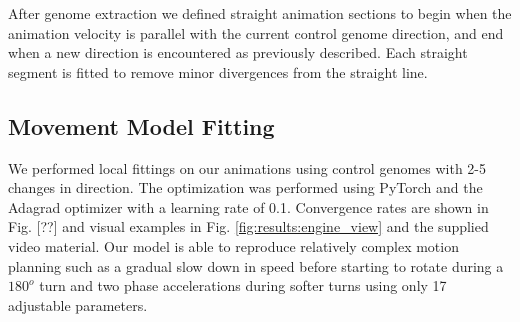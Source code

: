After genome extraction we defined straight animation sections to begin when the animation velocity is parallel with the current control genome direction, and end when a new direction is encountered as previously described. Each straight segment is fitted to remove minor divergences from the straight line.


\subsection{Movement Model Fitting}
We performed local fittings on our animations using control genomes with 2-5 changes in direction. The optimization was performed using PyTorch and the Adagrad optimizer with a learning rate of 0.1. Convergence rates are shown in Fig. [??] and visual examples in Fig. \ref{fig:results:engine_view} and the supplied video material. Our model is able to reproduce relatively complex motion planning such as a gradual slow down in speed before starting to rotate during a $180^o$ turn and two phase accelerations during softer turns using only 17 adjustable parameters. 

